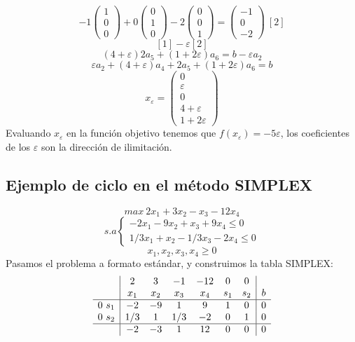 \documentclass[11pt,fleqn]{book} %
\begin{document}
$$-1 \left(\begin{array}{c}
  1 \\ 0 \\ 0
\end{array}\right)+0\left(\begin{array}{c}
  0 \\ 1 \\ 0
\end{array}\right)-2\left(\begin{array}{c}
  0 \\ 0 \\ 1
\end{array}\right)=\left(\begin{array}{c}
  -1 \\ 0 \\ -2
\end{array}\right) ~ [2]$$
$$[1]-\varepsilon[2]$$
$$(4+\varepsilon)2a_5+(1+2\varepsilon)a_6=b-\varepsilon a_2 $$
$$ \varepsilon a_2 + (4+\varepsilon)a_4+2a_5+(1+2\varepsilon)a_6=b$$
$$ x_\varepsilon=\left(\begin{array}{c}
  0 \\ \varepsilon \\ 0 \\ 4 + \varepsilon \\ 1 + 2\varepsilon
\end{array}\right)$$
Evaluando $x_\varepsilon$ en la función objetivo tenemos que $f(x_\varepsilon)=-5 \varepsilon$, los coeficientes de los $\varepsilon$ son la dirección de ilimitación.

\subsection{Ejemplo de ciclo en el método SIMPLEX}
$$ max ~2x_1+3x_2-x_3-12x_4$$
$$s.a \left\{
\begin{array}{c}
  -2x_1-9x_2+x_3+9x_4 \leq 0 \\
  1/3x_1+x_2-1/3x_3-2x_4 \leq 0
\end{array}
\right.
$$
$$x_1, x_2, x_3, x_4 \geq 0$$
Pasamos el problema a formato estándar, y construimos la tabla SIMPLEX:
$$
\begin{array}{c|cccccc|c}
  & 2 & 3 & -1 & -12 & 0 & 0 & \\
  & x_1 & x_2 & x_3 & x_4 & s_1 & s_2 & b \\ \hline
  0 ~ s_1 & -2 & -9 & 1 & 9 & 1 & 0 & 0 \\
  0 ~ s_2 & 1/3 & 1 & 1/3 & -2 & 0 & 1 & 0 \\ \hline
  & -2 & -3 & 1 & 12 & 0 & 0 & 0
\end{array}
$$
\end{document}
